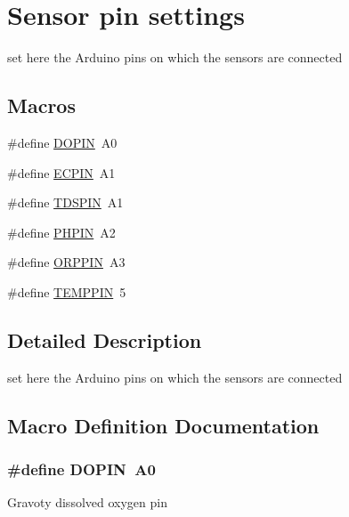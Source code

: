 \hypertarget{group___p_i_n___s_e_t_t_i_n_g_s}{}\section{Sensor pin settings}
\label{group___p_i_n___s_e_t_t_i_n_g_s}


set here the Arduino pins on which the sensors are connected  


\subsection*{Macros}
\begin{DoxyCompactItemize}
\item 
\#define \hyperlink{group___p_i_n___s_e_t_t_i_n_g_s_gabaa87b795b67d2f09dcda7e30c939e2b}{D\+O\+P\+IN}~A0
\item 
\#define \hyperlink{group___p_i_n___s_e_t_t_i_n_g_s_ga9eea325c048cdcab4c3b5f9771f7b512}{E\+C\+P\+IN}~A1
\item 
\#define \hyperlink{group___p_i_n___s_e_t_t_i_n_g_s_gaef0cf2dcc531d0afe308cb1ed8ab951a}{T\+D\+S\+P\+IN}~A1
\item 
\#define \hyperlink{group___p_i_n___s_e_t_t_i_n_g_s_ga992fbb764f982b28e19730a8327b67a6}{P\+H\+P\+IN}~A2
\item 
\#define \hyperlink{group___p_i_n___s_e_t_t_i_n_g_s_ga2f2dcc0d9b12ba6a368d780187c98017}{O\+R\+P\+P\+IN}~A3
\item 
\#define \hyperlink{group___p_i_n___s_e_t_t_i_n_g_s_ga4ba38e7a40eda1fcddf502aa2265c313}{T\+E\+M\+P\+P\+IN}~5
\end{DoxyCompactItemize}


\subsection{Detailed Description}
set here the Arduino pins on which the sensors are connected 



\subsection{Macro Definition Documentation}
\subsubsection[{\texorpdfstring{D\+O\+P\+IN}{DOPIN}}]{\setlength{\rightskip}{0pt plus 5cm}\#define D\+O\+P\+IN~A0}\hypertarget{group___p_i_n___s_e_t_t_i_n_g_s_gabaa87b795b67d2f09dcda7e30c939e2b}{}\label{group___p_i_n___s_e_t_t_i_n_g_s_gabaa87b795b67d2f09dcda7e30c939e2b}
Gravoty dissolved oxygen pin 
